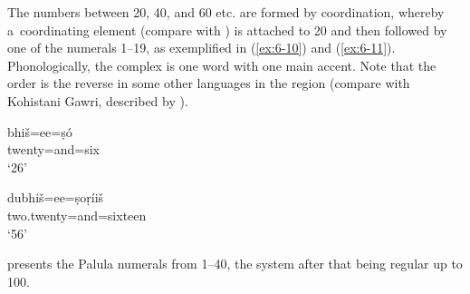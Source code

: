 The numbers between 20, 40, and 60 etc. are formed by coordination, whereby a~coordinating element (compare with ) is attached to 20 and then followed by one of the numerals 1--19, as exemplified in (\ref{ex:6-10}) and (\ref{ex:6-11}). Phonologically, the complex is one word with one main accent. Note that the order is the reverse in some other languages in the region (compare with Kohistani Gawri, described by \citealt[57]{baart1999a}).

\begin{exe}
\ex
\label{ex:6-10}
\gll bhiš=ee=ṣó \\
twenty=and=six \\
\glt `26'

\ex
\label{ex:6-11}
\gll dubhiš=ee=ṣoṛíiš \\
two.twenty=and=sixteen \\
\glt `56'
\end{exe}

 presents the Palula numerals from 1--40, the system after that being regular up to 100.


